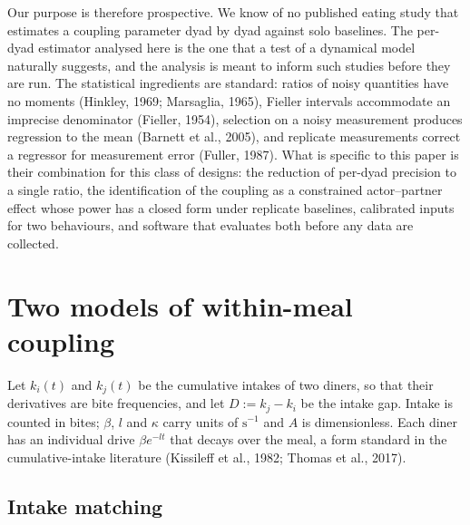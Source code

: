 \documentclass[12pt]{article}
\newcommand{\ki}{k_i}
\newcommand{\kj}{k_j}
\begin{document}
Our purpose is therefore prospective. We know of no published eating study that
estimates a coupling parameter dyad by dyad against solo baselines. The per-dyad
estimator analysed here is the one that a test of a dynamical model naturally
suggests, and the analysis is meant to inform such studies before they are run.
The statistical ingredients are standard: ratios of noisy quantities have no
moments (Hinkley, 1969; Marsaglia, 1965), Fieller intervals accommodate an
imprecise denominator (Fieller, 1954), selection on a noisy measurement produces
regression to the mean (Barnett et al., 2005), and replicate measurements correct
a regressor for measurement error (Fuller, 1987). What is specific to this paper
is their combination for this class of designs: the reduction of per-dyad
precision to a single ratio, the identification of the coupling as a constrained
actor--partner effect whose power has a closed form under replicate baselines,
calibrated inputs for two behaviours, and software that evaluates both before any
data are collected.

\section*{Two models of within-meal coupling}

Let $\ki(t)$ and $\kj(t)$ be the cumulative intakes of two diners, so that their
derivatives are bite frequencies, and let $D:=\kj-\ki$ be the intake gap. Intake
is counted in bites; $\beta$, $l$ and $\kappa$ carry units of $\mathrm{s}^{-1}$
and $A$ is dimensionless. Each diner has an individual drive $\beta e^{-lt}$ that
decays over the meal, a form standard in the cumulative-intake literature
(Kissileff et al., 1982; Thomas et al., 2017).

\subsection*{Intake matching}
\end{document}

